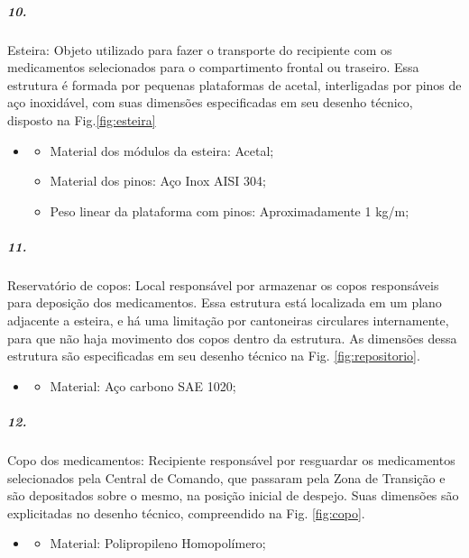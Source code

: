 \subparagraph*{10.}\label{retorno_esteira}
Esteira: Objeto utilizado para fazer o transporte do recipiente com os medicamentos selecionados para o compartimento frontal ou traseiro. Essa estrutura é formada por pequenas plataformas de acetal, interligadas por pinos de aço inoxidável, com suas dimensões especificadas em seu desenho técnico, disposto na Fig.\ref{fig:esteira}


\begin{itemize}
    \item[]
    \begin{itemize}
    \item  Material dos módulos da esteira: Acetal;
    \item  Material dos pinos: Aço Inox AISI 304;
    \item  Peso linear da plataforma com pinos: Aproximadamente 1 kg/m;
    \end{itemize}
\end{itemize}   

\subparagraph*{11.}\label{retorno_reservatorio}
Reservatório de copos: Local responsável por armazenar os copos responsáveis para deposição dos medicamentos. Essa estrutura está localizada em um plano adjacente a esteira, e há uma limitação por cantoneiras circulares internamente, para que não haja movimento dos copos dentro da estrutura. As dimensões dessa estrutura são especificadas em seu desenho técnico na Fig. \ref{fig:repositorio}.

\begin{itemize}
   \item[]
   \begin{itemize}
       \item  Material: Aço carbono SAE 1020;
   \end{itemize}
   \end{itemize}
  

\subparagraph*{12.} \label{retorno_copo}
Copo dos medicamentos: Recipiente responsável por resguardar os medicamentos selecionados pela Central de Comando, que passaram pela Zona de Transição e são depositados sobre o mesmo, na posição inicial de despejo. Suas dimensões são explicitadas no desenho técnico, compreendido na Fig. \ref{fig:copo}.

\begin{itemize}
   \item[]
   \begin{itemize}
       \item Material: Polipropileno Homopolímero;
   \end{itemize}
   \end{itemize}


